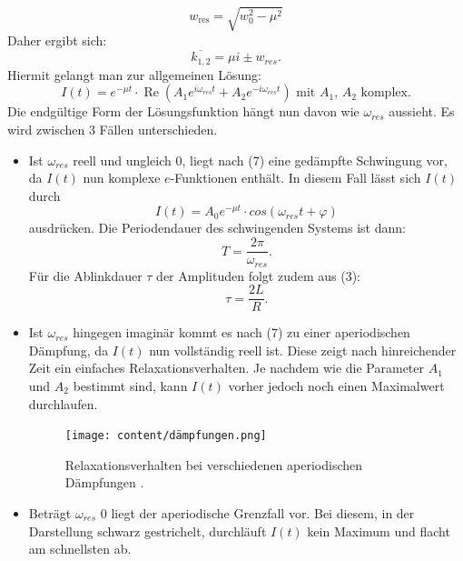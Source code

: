  \begin{equation}
 w_{\text{res}} = \sqrt{w_0^2-\mu^2}
 \end{equation}
  Daher ergibt sich:
 \begin{equation}
	 \overline{k_{1,2}} = \mu i \pm w_{res}\text{.}
 \end{equation}
 Hiermit gelangt man zur allgemeinen Lösung:
 \begin{equation}
   I(t) = e^{-\mu t} \cdot  \operatorname{Re}\left( A_1e^{i\omega_{res} t} + A_2e^{-i\omega_{res} t} \right) \text{ mit } A_1\text{, } A_2 \text{ komplex.}
 \end{equation}
 Die endgültige Form der Lösungsfunktion hängt nun davon wie $\omega_{res}$ aussieht.
  Es wird zwischen 3 Fällen unterschieden.
  \begin{itemize}

  \item Ist $\omega_{res}$ reell und ungleich 0, liegt nach (7) eine gedämpfte Schwingung vor, da $I(t)$ nun komplexe $e$-Funktionen enthält.
  In diesem Fall lässt sich $I(t)$ durch
  \begin{equation}
    I(t) = A_0 e^{-\mu t} \cdot cos(\omega_{res} t + \varphi)
  \end{equation}
  ausdrücken. Die Periodendauer des schwingenden Systems ist dann:
  \begin{equation}
    T = \frac{2 \pi}{\omega_{res}}\text{.}
  \end{equation}
  Für die Ablinkdauer $\tau$ der Amplituden folgt zudem aus (3):
  \begin{equation}
    \tau = \frac{2L}{R}\text{.}
  \end{equation}

  \item Ist $\omega_{res}$ hingegen imaginär kommt es nach (7) zu einer
  aperiodischen Dämpfung, da $I(t)$ nun vollständig reell ist. Diese zeigt nach hinreichender Zeit ein einfaches Relaxationsverhalten.
   Je nachdem wie die Parameter $A_1$ und $A_2$ bestimmt sind, kann $I(t)$ vorher jedoch noch einen
   Maximalwert durchlaufen.
   \begin{figure}[H]
     \centering
     \texttt{[image: content/dämpfungen.png]}
     \caption{Relaxationsverhalten bei verschiedenen aperiodischen Dämpfungen \cite{V354}.}
     \label{fig:Dämpfungen}
   \end{figure}

\item Beträgt $\omega_{res}$ 0 liegt der aperiodische Grenzfall vor. Bei diesem, in der Darstellung schwarz gestrichelt,
 durchläuft $I(t)$ kein Maximum und flacht am schnellsten ab.

\end{itemize}



